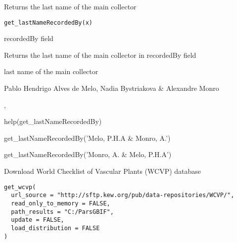\documentclass[a4paper]{book}
\begin{document}
%
\begin{Description}
Returns the last name of the main collector
\end{Description}
%
\begin{Usage}
\begin{verbatim}
get_lastNameRecordedBy(x)
\end{verbatim}
\end{Usage}
%
\begin{Arguments}
\begin{ldescription}
\item[\code{x}] recordedBy field
\end{ldescription}
\end{Arguments}
%
\begin{Details}
Returns the last name of the main collector in recordedBy field
\end{Details}
%
\begin{Value}
last name of the main collector
\end{Value}
%
\begin{Author}
Pablo Hendrigo Alves de Melo,
Nadia Bystriakova \&
Alexandre Monro
\end{Author}
%
\begin{SeeAlso}
, 
\end{SeeAlso}
%
\begin{Examples}
\begin{ExampleCode}

help(get_lastNameRecordedBy)

get_lastNameRecordedBy('Melo, P.H.A & Monro, A.')

get_lastNameRecordedBy('Monro, A. & Melo, P.H.A')

\end{ExampleCode}
\end{Examples}
%
\begin{Description}
Download World Checklist of Vascular Plants (WCVP) database
\end{Description}
%
\begin{Usage}
\begin{verbatim}
get_wcvp(
  url_source = "http://sftp.kew.org/pub/data-repositories/WCVP/",
  read_only_to_memory = FALSE,
  path_results = "C:/ParsGBIF",
  update = FALSE,
  load_distribution = FALSE
)
\end{verbatim}
\end{Usage}
\end{document}
